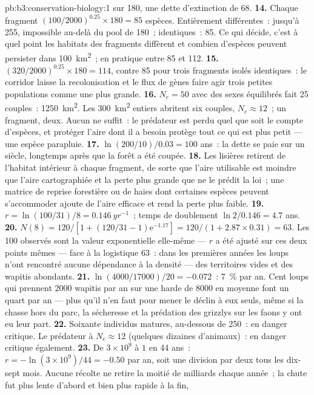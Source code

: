 \begin{solution}{pb:b3:conservation-biology:1}
sur 180, une dette d'extinction de 68.
\textbf{14.} Chaque fragment $(100/2000)^{0.25}\times 180 = 85$ espèces.
Entièrement différentes~: jusqu'à 255, impossible au-delà du pool de
180~; identiques~: 85. Ce qui décide, c'est à quel point les habitats
des fragments diffèrent et combien d'espèces peuvent persister dans
\qty{100}{km^2}~; en pratique entre 85 et 112.
\textbf{15.} $(320/2000)^{0.25}\times 180 = 114$, contre 85 pour trois
fragments isolés identiques~: le corridor laisse la recolonisation et le
flux de gènes faire agir trois petites populations comme une plus grande.
\textbf{16.} $N_{e} = 50$ avec des sexes équilibrés fait 25 couples~:
\qty{1250}{km^2}. Les \qty{300}{km^2} entiers abritent six couples,
$N_{e} \approx 12$~; un fragment, deux. Aucun ne suffit~: le prédateur
est perdu quel que soit le compte d'espèces, et protéger l'aire dont il
a besoin protège tout ce qui est plus petit --- une espèce parapluie.
\textbf{17.} $\ln(200/10)/0.03 = 100$ ans~: la dette se paie sur un
siècle, longtemps après que la forêt a été coupée.
\textbf{18.} Les lisières retirent de l'habitat intérieur à chaque
fragment, de sorte que l'aire utilisable est moindre que l'aire
cartographiée et la perte plus grande que ne le prédit la loi~; une
matrice de reprise forestière ou de haies dont certaines espèces peuvent
s'accommoder ajoute de l'aire efficace et rend la perte plus faible.
\textbf{19.} $r = \ln(100/31)/8 = \qty{0.146}{yr^{-1}}$~; temps de
doublement $\ln 2/0.146 = 4.7$ ans.
\textbf{20.} $N(8) = 120/[1 + (120/31 - 1)\mathrm{e}^{-1.17}] = 120/(1 +
2.87\times 0.31) = 63$. Les 100 observés sont la valeur exponentielle
elle-même --- $r$ a été ajusté sur ces deux points mêmes --- face à la
logistique 63~: dans les premières années les loups n'ont rencontré
aucune dépendance à la densité --- des territoires vides et des wapitis
abondants.
\textbf{21.} $\ln(4000/\num{17000})/20 = -0.072$~: \qty{7}{\%} par an.
Cent loups qui prennent \num{2000} wapitis par an sur une harde de
\num{8000} en moyenne font un quart par an --- plus qu'il n'en faut pour
mener le déclin à eux seuls, même si la chasse hors du parc, la
sécheresse et la prédation des grizzlys sur les faons y ont eu leur part.
\textbf{22.} Soixante individus matures, au-dessous de 250~: en danger
critique. Le prédateur à $N_{e} \approx 12$ (quelques dizaines
d'animaux)~: en danger critique également.
\textbf{23.} De $3\times 10^{9}$ à $1$ en 44 ans~: $r = -\ln(3\times
10^{9})/44 = -0.50$ par an, soit une division par deux tous les
dix-sept mois. Aucune récolte ne retire la moitié de milliards chaque
année~; la chute fut plus lente d'abord et bien plus rapide à la fin,

\end{solution}
